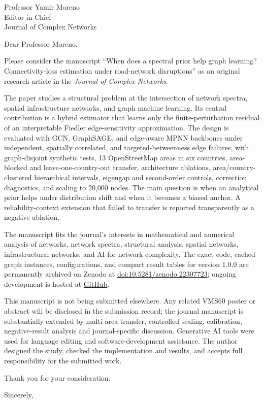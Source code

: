 \documentclass[10pt]{letter}
\begin{document}
\begin{letter}{Professor Yamir Moreno\\Editor-in-Chief\\Journal of Complex Networks}
\opening{Dear Professor Moreno,}

Please consider the manuscript ``When does a spectral prior help graph
learning? Connectivity-loss estimation under road-network disruptions'' as an original
research article in the \emph{Journal of Complex Networks}.

The paper studies a structural problem at the intersection of network spectra,
spatial infrastructure networks, and graph machine learning. Its central
contribution is a hybrid estimator that learns only the finite-perturbation
residual of an interpretable Fiedler edge-sensitivity approximation. The design
is evaluated with GCN, GraphSAGE, and edge-aware MPNN backbones under
independent, spatially correlated, and targeted-betweenness edge failures, with
graph-disjoint synthetic tests, 13 OpenStreetMap areas in six countries,
area-blocked and leave-one-country-out transfer, architecture ablations,
area/country-clustered hierarchical intervals, eigengap and second-order controls, correction
diagnostics, and scaling to 20,000 nodes. The main question is when an analytical
prior helps under distribution shift and when it becomes a biased anchor. A
reliability-context extension that failed to transfer
is reported transparently as a negative ablation.

The manuscript fits the journal's interests in mathematical and numerical
analysis of networks, network spectra, structural analysis, spatial networks,
infrastructural networks, and AI for network complexity. The exact code, cached
graph instances, configurations, and compact result tables for version 1.0.0
are permanently archived on Zenodo at
\href{https://doi.org/10.5281/zenodo.22307723}{doi:10.5281/zenodo.22307723};
ongoing development is hosted at
\href{https://github.com/lee-vtruong/ResiliRoad}{GitHub}.

This manuscript is not being submitted elsewhere. Any related VMS60 poster or
abstract will be disclosed in the submission record; the journal manuscript is
substantially extended by multi-area transfer, controlled scaling, calibration,
negative-result analysis and journal-specific discussion. Generative AI tools
were used for language editing and software-development assistance. The author
designed the study, checked the implementation and results, and accepts full
responsibility for the submitted work.

Thank you for your consideration.

\closing{Sincerely,}
\end{letter}
\end{document}
